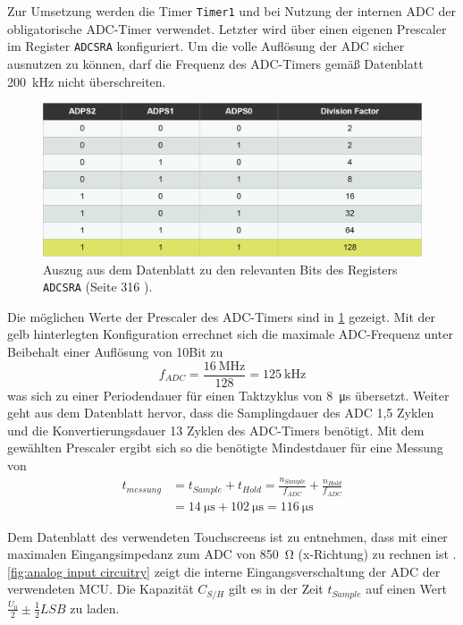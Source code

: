		Zur Umsetzung werden die Timer \texttt{Timer1} und bei Nutzung der internen ADC der obligatorische ADC-Timer verwendet.
		Letzter wird über einen eigenen Prescaler im Register \texttt{ADCSRA} konfiguriert.
		Um die volle Auflösung der ADC sicher ausnutzen zu können, darf die Frequenz des ADC-Timers gemäß Datenblatt \SI{200}{\kilo\hertz} nicht überschreiten.
		\begin{figure}[h]
			\centering
			\includegraphics[width=.9\textwidth]{fig/ADC-Timer_Config.png}
			\caption[Auszug aus dem Datenblatt zu den relevanten Bits des Registers \texttt{ADCSRA}]{Auszug aus dem Datenblatt zu den relevanten Bits des Registers \texttt{ADCSRA} (Seite 316 \cite{MicrochipTechnologyInc.ATmega32U4.Datasheet.2016}).}
			\label{fig:adc timer konfig}
		\end{figure}
		Die möglichen Werte der Prescaler des ADC-Timers sind in \cref{fig:adc timer konfig} gezeigt.
		Mit der gelb hinterlegten Konfiguration errechnet sich die maximale ADC-Frequenz unter Beibehalt einer Auflösung von 10Bit zu
		\begin{equation}
			f_{ADC} = \frac{\SI{16}{\mega\hertz}}{128} = \SI{125}{\kilo\hertz}
			\label{eq:adc timer}
		\end{equation}
		was sich zu einer Periodendauer für einen Taktzyklus von \SI{8}{\micro\second} übersetzt.
		Weiter geht aus dem Datenblatt hervor, dass die Samplingdauer des ADC 1,5 Zyklen und die Konvertierungsdauer 13 Zyklen des ADC-Timers benötigt.
		Mit dem gewählten Prescaler ergibt sich so die benötigte Mindestdauer für eine Messung von
		\begin{align}
			t_{messung} &= t_{Sample} + t_{Hold} = \frac{n_{Sample}}{f_{ADC}} + \frac{n_{Hold}}{f_{ADC}} \nonumber \\
						&= \SI{14}{\micro\second} + \SI{102}{\micro\second} = \SI{116}{\micro\second}
			\label{eq:adc messdauer}
		\end{align}

		Dem Datenblatt des verwendeten Touchscreens ist zu entnehmen, dass mit einer maximalen Eingangsimpedanz zum ADC von \SI{850}{\ohm} (x-Richtung) zu rechnen ist \cite{FUJITSU.touchscreen.datasheet}.
		\cref{fig:analog input circuitry} zeigt die interne Eingangsverschaltung der ADC der verwendeten MCU. Die Kapazität \(C_{S/H}\) gilt es in der Zeit \(t_{Sample}\) auf einen Wert \(\frac{U_0}{2} \pm \frac{1}{2}LSB\) zu laden.

